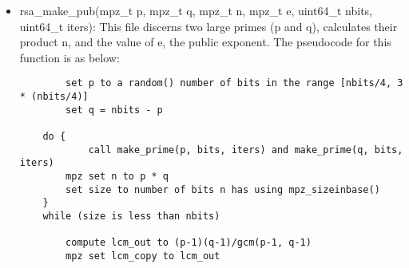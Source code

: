 \documentclass[11pt]{article}
\begin{document}
\begin{itemize}
    \item rsa\_make\_pub(mpz\_t p, mpz\_t q, mpz\_t n, mpz\_t e, uint64\_t nbits, uint64\_t iters): This file discerns two large primes (p and q), calculates their product n, and the value of e, the public exponent. The pseudocode for this function is as below:
    \begin{verbatim}
        set p to a random() number of bits in the range [nbits/4, 3 * (nbits/4)]
        set q = nbits - p

	do {
        	call make_prime(p, bits, iters) and make_prime(q, bits, iters)
		mpz set n to p * q
		set size to number of bits n has using mpz_sizeinbase()
	}
	while (size is less than nbits)

        compute lcm_out to (p-1)(q-1)/gcm(p-1, q-1)
        mpz set lcm_copy to lcm_out


\end{verbatim}
\end{itemize}
\end{document}
